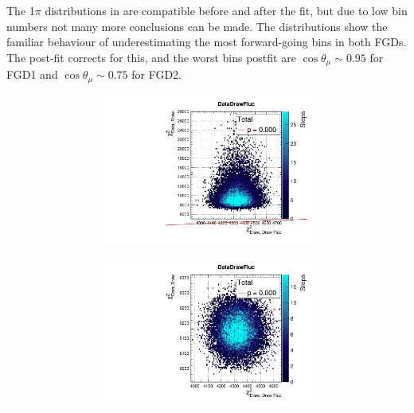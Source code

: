 The 1$\pi$ distributions in \pmu are compatible before and after the fit, but due to low bin numbers not many more conclusions can be made. The \cosmu distributions show the familiar behaviour of underestimating the most forward-going bins in both FGDs. The post-fit corrects for this, and the worst bins postfit are $\cos\theta_\mu\sim0.95$ for FGD1 and $\cos\theta_\mu\sim0.75$ for FGD2.
\begin{figure}[h]
	\begin{subfigure}[t]{\textwidth}
		\begin{subfigure}[t]{0.24\textwidth}
			\includegraphics[width=\textwidth, trim={0mm 0mm 0mm 8mm}, clip,page=118]{figures/mach3/2018/data/2018a_FixedCov_RedCov_Mpi_Data_merge_PriorPred_procs}
		\end{subfigure}
		\begin{subfigure}[t]{0.24\textwidth}
			\includegraphics[width=\textwidth, trim={0mm 0mm 0mm 8mm}, clip,page=118]{figures/mach3/2018/data/2018a_FixedCov_RedCov_Mpi_Data_merge_PostPredStore_FullLLH_procs}

\end{subfigure}
\end{subfigure}
\end{figure}
